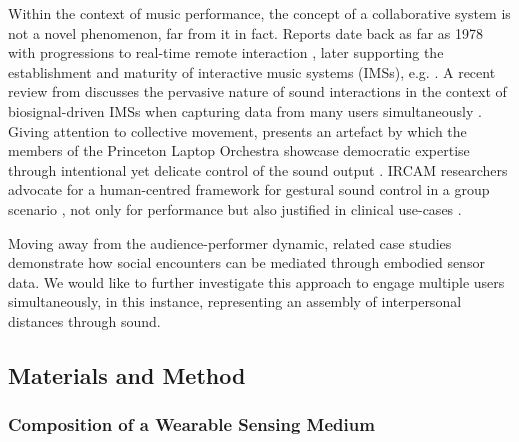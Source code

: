 
Within the context of music performance, the concept of a collaborative system is not a novel phenomenon, far from it in fact. Reports date back as far as 1978 \citep{bischoff_music_1978} with progressions to real-time remote interaction \citep{barbosa_displaced_2003}, later supporting the establishment and maturity of interactive music systems (IMSs), e.g. \citep{jorda_reactable_2007,freeman_auracle_2005}. A recent review from \citeauthor{aly_appropriating_2021} discusses the pervasive nature of sound interactions in the context of biosignal-driven IMSs when capturing data from many users simultaneously \cite{aly_appropriating_2021}. Giving attention to collective movement, \citeauthor{hege_spirit_2014} presents an artefact by which the members of the Princeton Laptop Orchestra showcase democratic expertise through intentional yet delicate control of the sound output \cite{hege_spirit_2014}. IRCAM researchers advocate for a human-centred framework for gestural sound control in a group scenario \citep{schnell_collective_2015}, not only for performance but also justified in clinical use-cases \citep{bevilacqua_exploring_2018}.

Moving away from the audience-performer dynamic, related case studies \citep{roo_physio-stacks_2020,howell_life-affirming_2019,ashford_eeg_2019} demonstrate how social encounters can be mediated through embodied sensor data. We would like to further investigate this approach to engage multiple users simultaneously, in this instance, representing an assembly of interpersonal distances through sound.

\subsection{Materials and Method}
\label{sec3:method}

\subsubsection{Composition of a Wearable Sensing Medium}
\label{sec3.1:tech_composition}

